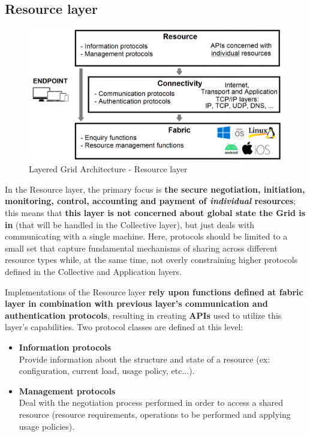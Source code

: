 \subsection{Resource layer}
\begin{figure}[!ht]
    \centering
    \includegraphics[scale=0.35]{document/chapters/chapter_2/images/resource_layer.png}
    \caption{Layered Grid Architecture - Resource layer}
    \label{fig:resource_layer}
\end{figure}

\noindent In the Resource layer, the primary focus is \textbf{the secure negotiation, initiation, monitoring, control, accounting and payment of \textit{individual} resources}; this means that \textbf{this layer is not concerned about global state the Grid is in} (that will be handled in the Collective layer), but just deals with communicating with a single machine. Here, protocols should be limited to a small set that capture fundamental mechanisms of sharing across different resource types while, at the same time, not overly constraining higher protocols defined in the Collective and Application layers.

Implementations of the Resource layer \textbf{rely upon functions defined at fabric layer in combination with previous layer's communication and authentication protocols}, resulting in creating \textbf{APIs} used to utilize this layer's capabilities.
Two protocol classes are defined at this level:
\begin{itemize}
    \item \textbf{Information protocols}\\
    Provide information about the structure and state of a resource (ex: configuration, current load, usage policy, etc...).
    \item \textbf{Management protocols}\\
    Deal with the negotiation process performed in order to access a shared resource (resource requirements, operations to be performed and applying usage policies).
\end{itemize} 

